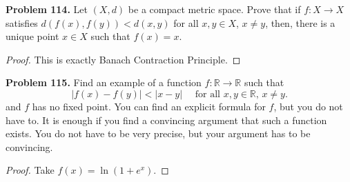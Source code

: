 \documentclass[12pt,leqno]{amsart}
\theoremstyle{definition}
\numberwithin{equation}{subsection}
\begin{document}
\medskip

\noindent
{\bf Problem 114.}
Let $(X,d)$ be a compact metric space. Prove that if $f:X\to X$ satisfies $d(f(x),f(y))<d(x,y)$ for all $x,y\in X$, $x\neq y$, then, there is a unique point $x\in X$ such that $f(x)=x$.
\begin{proof}
This is exactly Banach Contraction Principle.
\end{proof}

\noindent
{\bf Problem 115.}
Find an example of a function $f:\mathbb{R}\to\mathbb{R}$ such that
$$
|f(x)-f(y)|<|x-y|
\quad
\text{  for all $x,y\in\mathbb{R}$, $x\neq y$.}
$$
and $f$ has no fixed point. You can find an explicit formula for $f$, but you do not have to. It is enough if you find a convincing argument that such a function exists. You do not have to be very precise, but your argument has to be convincing.
\begin{proof}
Take $f(x) = \ln\left(1 + e^x\right)$.
\end{proof}

\medskip
\end{document}
